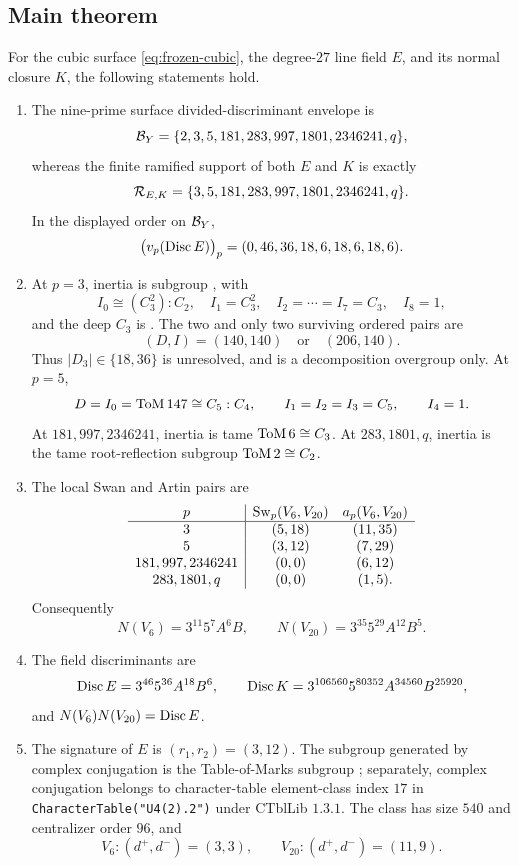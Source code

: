 \subsection{Main theorem}

\begin{theorem}
\label{thm:main}
For the cubic surface \cref{eq:frozen-cubic}, the degree-$27$ line field
$E$, and its normal closure $K$, the following statements hold.

\begin{enumerate}[label=\textup{(\alph*)},leftmargin=2.2em]
\item The nine-prime surface divided-discriminant envelope is
\[
 \mathcal{B}_Y=\{2,3,5,181,283,997,1801,2346241,q\},
\]
whereas the finite ramified support of both $E$ and $K$ is exactly
\[
 \mathcal{R}_{E,K}=\{3,5,181,283,997,1801,2346241,q\}.
\]
In the displayed order on $\mathcal{B}_Y$,
\[
 \bigl(v_p(\operatorname{Disc} E)\bigr)_p=(0,46,36,18,6,18,6,18,6).
\]

\item At $p=3$, inertia is subgroup , with
\[
 I_0\cong(C_3^2):C_2,\quad I_1=C_3^2,\quad
 I_2=\cdots=I_7=C_3,\quad I_8=1,
\]
and the deep $C_3$ is .  The two and only two surviving ordered
pairs are
\[
 (D,I)=(140,140)\quad\text{or}\quad(206,140).
\]
Thus $|D_3|\in\{18,36\}$ is unresolved, and  is a decomposition
overgroup only.  At $p=5$,
\[
 D=I_0=\mathrm{ToM}\,147\cong C_5:C_4,\qquad
 I_1=I_2=I_3=C_5,\qquad I_4=1.
\]
At $181,997,2346241$, inertia is tame
$\mathrm{ToM}\,6\cong C_3$.  At $283,1801,q$, inertia is the tame root-reflection
subgroup $\mathrm{ToM}\,2\cong C_2$.

\item The local Swan and Artin pairs are
\[
\begin{array}{c|cc}
p&\operatorname{Sw}_p(V_6,V_{20})&a_p(V_6,V_{20})\\ \hline
3&(5,18)&(11,35)\\
5&(3,12)&(7,29)\\
181,997,2346241&(0,0)&(6,12)\\
283,1801,q&(0,0)&(1,5).
\end{array}
\]
Consequently
\[
 N(V_6)=3^{11}5^7A^6B,\qquad
 N(V_{20})=3^{35}5^{29}A^{12}B^5.
\]

\item The field discriminants are
\[
 \operatorname{Disc} E=3^{46}5^{36}A^{18}B^6,\qquad
 \operatorname{Disc} K=3^{106560}5^{80352}A^{34560}B^{25920},
\]
and $N(V_6)N(V_{20})=\operatorname{Disc} E$.

\item The signature of $E$ is $(r_1,r_2)=(3,12)$.  The subgroup generated by
complex conjugation is the Table-of-Marks subgroup ; separately,
complex conjugation belongs to character-table element-class index $17$ in
\texttt{CharacterTable("U4(2).2")} under CTblLib $1.3.1$.  The class has
size $540$ and centralizer order $96$, and
\[
 V_6:(d^+,d^-)=(3,3),\qquad
 V_{20}:(d^+,d^-)=(11,9).
\]
\end{enumerate}
\end{theorem}

